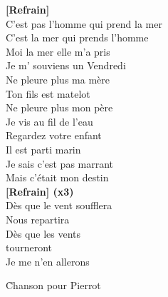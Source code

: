 \documentclass{novel}
\begin{document}
\begin{multicols}{3}
\textbf{[Refrain]} \\

C'est pas l'homme qui prend la mer \\
C'est la mer qui prends l'homme \\
Moi la mer elle m'a pris \\
Je m' souviens un Vendredi \\
Ne pleure plus ma mère \\
Ton fils est matelot \\
Ne pleure plus mon père \\
Je vis au fil de l'eau \\
Regardez votre enfant \\
Il est parti marin \\
Je sais c'est pas marrant \\
Mais c'était mon destin \\

\textbf{[Refrain] (x3)} \\

Dès que le vent soufflera \\
Nous repartira \\
Dès que les vents \\
tourneront \\
Je me n'en allerons \\
\end{multicols}


\newpage
\normalsize

\h*{Chanson pour Pierrot}
\end{document}
